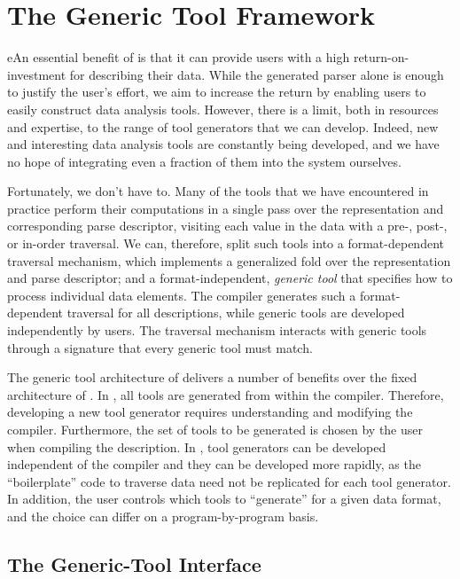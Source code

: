 \section{The Generic Tool Framework}
\label{sec:gen-tool}

eAn essential benefit of \padsml{} is that it can provide users
with a high return-on-investment for describing their data. While the
generated parser alone is enough to justify the user's effort, we aim
to increase the return by enabling users to easily construct data
analysis tools. However, there is a limit, both in resources and
expertise, to the range of tool generators that we can develop.
Indeed, new and interesting data analysis tools are constantly being
developed, and we have no hope of integrating even a fraction of them
into the \padsml{} system ourselves.

Fortunately, we don't have to. Many of the tools that we have
encountered in practice perform their computations in a single pass
over the representation and corresponding parse descriptor, visiting
each value in the data with a pre-, post-, or in-order traversal.
We can, therefore, split such tools into a format-dependent traversal
mechanism, which implements a generalized fold over the representation
and parse descriptor; and a format-independent, \emph{generic tool}
that specifies how to process individual data elements. The \padsml{}
compiler generates such a format-dependent traversal for all
descriptions, while generic tools are developed independently by
users. The traversal mechanism interacts with generic tools through a
signature that every generic tool must match.

The generic tool architecture of \padsml{} delivers a number of
benefits over the fixed architecture of \padsc{}. In \padsc{}, all
tools are generated from within the compiler. Therefore, developing a
new tool generator requires understanding and modifying the compiler.
Furthermore, the set of tools to be generated is chosen by the user
when compiling the description.  In \padsml{}, tool generators can be
developed independent of the compiler and they can be developed more
rapidly, as the ``boilerplate'' code to traverse data need not be
replicated for each tool generator. In addition, the user controls
which tools to ``generate'' for a given data format, and the choice
can differ on a program-by-program basis.

\subsection{The Generic-Tool Interface}
\label{sec:gentool-interface}


